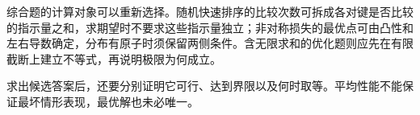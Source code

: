 综合题的计算对象可以重新选择。随机快速排序的比较次数可拆成各对键是否比较的指示量之和，求期望时不要求这些指示量独立；非对称损失的最优点可由凸性和左右导数确定，分布有原子时须保留两侧条件。含无限求和的优化题则应先在有限截断上建立不等式，再说明极限为何成立。

求出候选答案后，还要分别证明它可行、达到界限以及何时取等。平均性能不能保证最坏情形表现，最优解也未必唯一。
\par\smallskip
